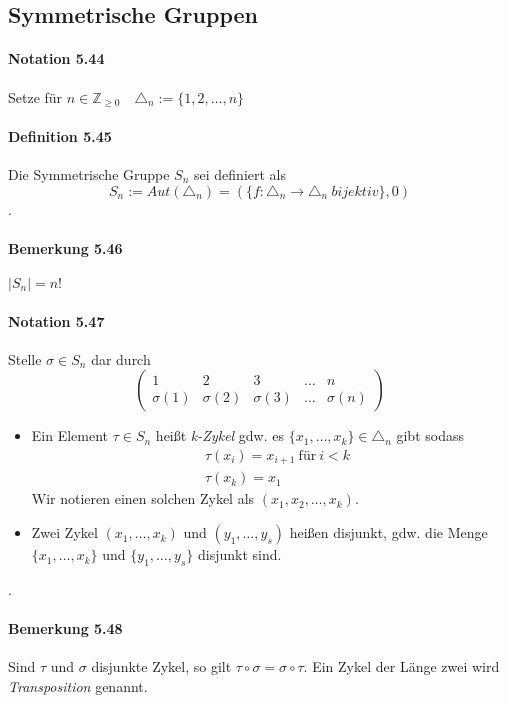 \documentclass{scrartcl}
\begin{document}
\subsection{Symmetrische Gruppen}
\label{subsec:symmetrischegruppen}

\paragraph{Notation 5.44}
Setze für $n \in \mathbb{Z}_{\geq 0}$~~$\triangle_n := \{1,2, \dots, n\}$

\paragraph{Definition 5.45}
Die Symmetrische Gruppe $S_n$ sei definiert als
\[
  S_n := Aut(\triangle_n) = (\{f: \triangle_n \to \triangle_n ~bijektiv\}, 0)
\]
.

\paragraph{Bemerkung 5.46}
$|S_n| = n!$

\paragraph{Notation 5.47}
Stelle $\sigma \in S_n$ dar durch
\[
  \begin{pmatrix}
    1         & 2         & 3         & \dots & n         \\
    \sigma(1) & \sigma(2) & \sigma(3) & \dots & \sigma(n)
  \end{pmatrix}
\]
\begin{itemize}
\item Ein Element $\tau \in S_n$ heißt \textit{k-Zykel} gdw. es $\{x_1, \dots,
  x_k\} \in \triangle_n$ gibt sodass
  \[
    \begin{matrix}
      &\tau(x_i) = x_{i+1} ~\text{für}~ i < k \\
      &\tau(x_k) = x_1
    \end{matrix}
  \]
  Wir notieren einen solchen Zykel als $(x_1, x_2, \dots, x_k)$.
  \item Zwei Zykel $(x_1, \dots, x_k)$ und $(y_1, \dots, y_s)$ heißen disjunkt,
    gdw. die Menge $\{x_1, \dots, x_k\}$ und $\{y_1, \dots, y_s\}$ disjunkt sind.
\end{itemize}
.

\paragraph{Bemerkung 5.48}
Sind $\tau$ und $\sigma$ disjunkte Zykel, so gilt $\tau \circ \sigma = \sigma
\circ \tau$. Ein Zykel der Länge zwei wird \textit{Transposition} genannt.
\end{document}
